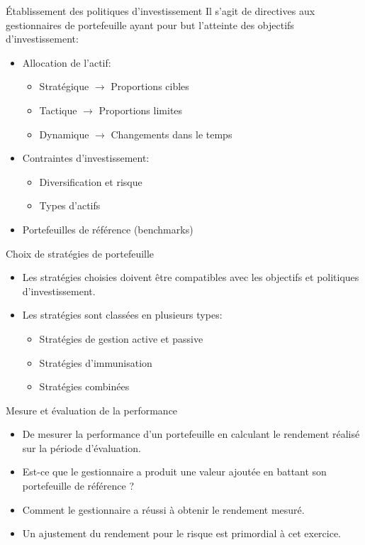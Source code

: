 \documentclass[10pt,a4paper]{beamer}
\begin{document}
\begin{frame}{Établissement des politiques d’investissement}
Il s’agit de directives aux gestionnaires de portefeuille ayant pour but l’atteinte des objectifs d’investissement:

\begin{itemize}[label=\bullet]
\item Allocation de l’actif:
\begin{itemize}[label=-]
\item Stratégique $\rightarrow$ Proportions cibles
\item Tactique $\rightarrow$ Proportions limites
\item Dynamique $\rightarrow$ Changements dans le temps
\end{itemize}
\item Contraintes d’investissement:
\begin{itemize}[label=-]
\item Diversification et risque
\item Types d’actifs
\end{itemize}
\item Portefeuilles de référence (benchmarks)
\end{itemize}
\end{frame}

\begin{frame}{Choix de stratégies de portefeuille}

\begin{itemize}[label=\bullet]
\item Les stratégies choisies doivent être compatibles avec les objectifs et politiques d’investissement.

\item Les stratégies sont classées en plusieurs types: 
\begin{itemize}[label=-]
\item Stratégies de gestion active et passive
\item Stratégies d’immunisation
\item Stratégies combinées
\end{itemize}
\end{itemize}
\end{frame}

\begin{frame}{Mesure et évaluation de la performance}
\begin{itemize}[label=\bullet]
\item De mesurer la performance d’un portefeuille en calculant le rendement réalisé sur la période d’évaluation.
\item Est-ce que le gestionnaire a produit une valeur ajoutée en battant son portefeuille de référence ?
\item Comment le gestionnaire a réussi à obtenir le rendement mesuré.  
\item Un ajustement du rendement pour le risque est primordial à cet exercice.  
\end{itemize}
\end{frame}
\end{document}
